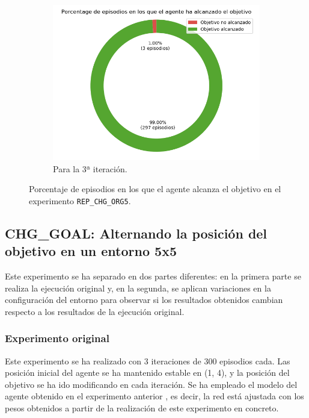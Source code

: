 \begin{figure}
\begin{subfigure}{.5\textwidth}
    \end{subfigure}
    \begin{subfigure}{.5\textwidth}
        \centering
        \includegraphics[scale=0.3]{cap5_experimentacion/images/CHANGE_ORIGIN-20_09-19_22-2, 1, 0_it3_porcentajeResuelto.png}
        \caption{Para la 3ª iteración.}
        \label{fig:CHANGE_ORIGIN-20_09-19_22-2, 1, 0_it3_porcentajeResuelto}
    \end{subfigure}%
    \caption{Porcentaje de episodios en los que el agente alcanza el objetivo en el experimento \texttt{REP\_CHG\_ORG5}.}
    \label{fig:CHANGE_ORIGIN-20_09-19_22-2, 1, 0_porcentajeResuelto}
\end{figure}

\subsection{CHG\_GOAL: Alternando la posición del objetivo en un entorno 5x5} \label{CHG_GOAL}

Este experimento se ha separado en dos partes diferentes: en la primera parte se realiza la ejecución original y, en la segunda, se aplican variaciones en la configuración del entorno para observar si los resultados obtenidos cambian respecto a los resultados de la ejecución original. 

\subsubsection{Experimento original}

Este experimento se ha realizado con 3 iteraciones de 300 episodios cada. Las posición inicial del agente se ha mantenido estable en (1, 4), y la posición del objetivo se ha ido modificando en cada iteración. Se ha empleado el modelo del agente obtenido en el experimento anterior , es decir, la red está ajustada con los pesos obtenidos a partir de la realización de este experimento en concreto. \\

